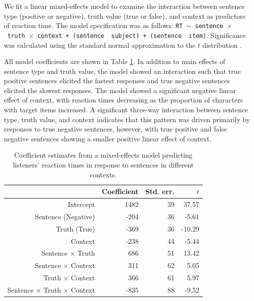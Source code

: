 \documentclass[man, noapacite]{apa2}
\begin{document}
We fit a linear mixed-effects model to examine the interaction between sentence type (positive or negative), truth value (true or false), and context as predictors of reaction time. The model specification was as follows: \texttt{RT $\sim$ sentence~$\times$~truth~$\times$~context + (sentence~\textbar~subject) +  (sentence~\textbar~item)}.  Significance was calculated using the standard normal approximation to the $t$ distribution \cite{barr2013}.

All model coefficients are shown in Table \ref{tab:listenermodel}. In addition to main effects of sentence type and truth value, the model showed an interaction such that true positive sentences elicited the fastest responses and true negative sentences elicited the slowest responses. The model showed a significant negative linear effect of context, with reaction times decreasing as the proportion of characters with target items increased. A significant three-way interaction between sentence type, truth value, and context indicates that this pattern was driven primarily by responses to true negative sentences, however, with true positive and false negative sentences showing a smaller positive linear effect of context.  

\begin{table}[t]
\caption{\label{tab:listenermodel} Coefficient estimates from a mixed-effects model predicting listeners' reaction times in response to sentences in different contexts.}
\begin{center}
\begin{tabular}{rrrr}
  \hline
 & Coefficient & Std. err. & $t$ \\ 
  \hline
Intercept & 1482 & 39 & 37.57 \\ 
  Sentence (Negative) & -204 & 36 & -5.61  \\ 
  Truth (True) & -369 & 36 & -10.29 \\
  Context & -238 & 44 & -5.44 \\ 
  Sentence $\times$ Truth & 686 & 51 & 13.42 \\
  Sentence $\times$ Context & 311 & 62 & 5.05 \\
  Truth $\times$ Context & 366 & 61 & 5.97 \\
  Sentence $\times$ Truth $\times$ Context & -835 & 88 & -9.52 \\
   \hline
\end{tabular}
\vspace{-1.5cm}
\end{center}
\end{table}
\end{document}
